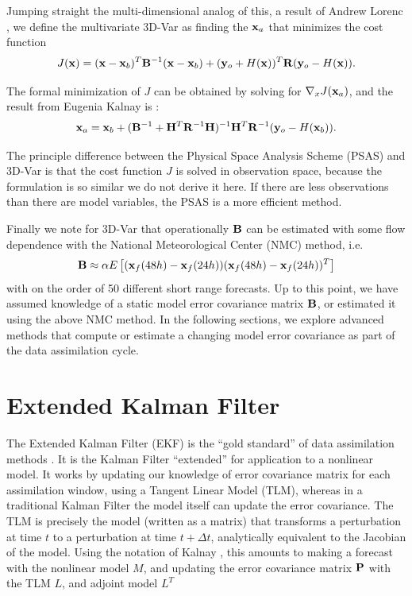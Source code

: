 Jumping straight the multi-dimensional analog of this, a result of Andrew Lorenc , we define the multivariate 3D-Var as finding the $\mathbf{x} _a$ that minimizes the cost function
\begin{equation} J(\mathbf{x}) = (\mathbf{x} - \mathbf{x}_b) ^T \mathbf{B} ^{-1} (\mathbf{x} - \mathbf{x}_b) + (\mathbf{y}_o + H(\mathbf{x}))^T\mathbf{R} (\mathbf{y}_o - H(\mathbf{x})) .\end{equation}

The formal minimization of $J$ can be obtained by solving for $\nabla_x J(\mathbf{x}_a)$, and the result from Eugenia Kalnay is :
\begin{equation} \mathbf{x}_a = \mathbf{x}_b+(\mathbf{B}^{-1} + \mathbf{H}^T\mathbf{R}^{-1}\mathbf{H})^{-1}\mathbf{H}^T\mathbf{R}^{-1}(\mathbf{y}_o-H(\mathbf{x}_b)) .\end{equation}

The principle difference between the Physical Space Analysis Scheme (PSAS) and 3D-Var is that the cost function $J$ is solved in observation space, because the formulation is so similar we do not derive it here.
If there are less observations than there are model variables, the PSAS is a more efficient method.

Finally we note for 3D-Var that operationally $\mathbf{B}$ can be estimated with some flow dependence with the National Meteorological Center (NMC) method, i.e.
\begin{equation} \mathbf{B} \approx \alpha E \left [ (\mathbf{x}_f(48h)-\mathbf{x}_f(24h))(\mathbf{x}_f(48h)-\mathbf{x}_f(24h))^T \right ] \end{equation}
with on the order of 50 different short range forecasts.
Up to this point, we have assumed knowledge of a static model error covariance matrix $\mathbf{B}$, or estimated it using the above NMC method.
In the following sections, we explore advanced methods that compute or estimate a changing model error covariance as part of the data assimilation cycle.

\section{Extended Kalman Filter}


The Extended Kalman Filter (EKF) is the ``gold standard'' of data assimilation methods .
It is the Kalman Filter ``extended'' for application to a nonlinear model.
It works by updating our knowledge of error covariance matrix for each assimilation window, using a Tangent Linear Model (TLM), whereas in a traditional Kalman Filter the model itself can update the error covariance.
The TLM is precisely the model (written as a matrix) that transforms a perturbation at time $t$ to a perturbation at time $t+\Delta t$, analytically equivalent to the Jacobian of the model.
Using the notation of Kalnay \cite{kalnay2003}, this amounts to making a forecast with the nonlinear model $M$, and updating the error covariance matrix $\mathbf{P}$ with the TLM $L$, and adjoint model $L^T$

